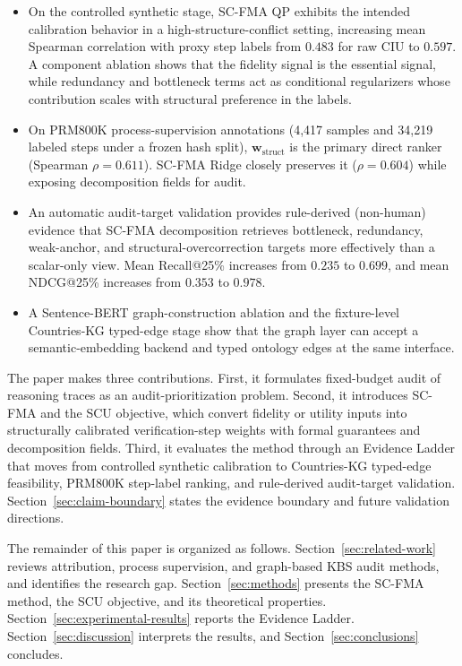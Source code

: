 \documentclass[a4paper,fleqn]{cas-sc}
\newcommand{\wstruct}{\ensuremath{\mathbf{w}_{\mathrm{struct}}}}
\begin{document}
\begin{itemize}
  \item On the controlled synthetic stage, SC-FMA QP exhibits the intended calibration behavior in a high-structure-conflict setting, increasing mean Spearman correlation with proxy step labels from $0.483$ for raw CIU to $0.597$. A component ablation shows that the fidelity signal is the essential signal, while redundancy and bottleneck terms act as conditional regularizers whose contribution scales with structural preference in the labels.
  \item On PRM800K process-supervision annotations (4,417 samples and 34,219 labeled steps under a frozen hash split), \wstruct{} is the primary direct ranker (Spearman $\rho = 0.611$). SC-FMA Ridge closely preserves it ($\rho = 0.604$) while exposing decomposition fields for audit.
  \item An automatic audit-target validation provides rule-derived (non-human) evidence that SC-FMA decomposition retrieves bottleneck, redundancy, weak-anchor, and structural-overcorrection targets more effectively than a scalar-only view. Mean Recall@25\% increases from $0.235$ to $0.699$, and mean NDCG@25\% increases from $0.353$ to $0.978$.
  \item A Sentence-BERT graph-construction ablation and the fixture-level Countries-KG typed-edge stage show that the graph layer can accept a semantic-embedding backend and typed ontology edges at the same interface.
\end{itemize}

The paper makes three contributions. First, it formulates fixed-budget audit of reasoning traces as an audit-prioritization problem. Second, it introduces SC-FMA and the SCU objective, which convert fidelity or utility inputs into structurally calibrated verification-step weights with formal guarantees and decomposition fields. Third, it evaluates the method through an Evidence Ladder that moves from controlled synthetic calibration to Countries-KG typed-edge feasibility, PRM800K step-label ranking, and rule-derived audit-target validation. Section~\ref{sec:claim-boundary} states the evidence boundary and future validation directions.

The remainder of this paper is organized as follows. Section~\ref{sec:related-work} reviews attribution, process supervision, and graph-based KBS audit methods, and identifies the research gap. Section~\ref{sec:methods} presents the SC-FMA method, the SCU objective, and its theoretical properties. Section~\ref{sec:experimental-results} reports the Evidence Ladder. Section~\ref{sec:discussion} interprets the results, and Section~\ref{sec:conclusions} concludes.
\end{document}
